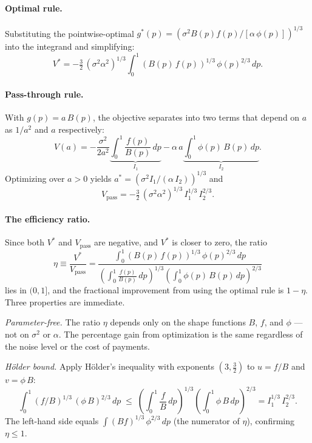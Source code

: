 \documentclass[11pt]{article}
\begin{document}
\paragraph{Optimal rule.} Substituting the pointwise-optimal $g^*(p) = (\sigma^2 B(p) f(p)/[\alpha\,\phi(p)])^{1/3}$ into the integrand and simplifying:
\begin{equation}\label{eq:V-opt}
V^* = -\tfrac{3}{2}\,(\sigma^2 \alpha^2)^{1/3} \int_0^1 (B(p)\,f(p))^{1/3}\,\phi(p)^{2/3}\,dp.
\end{equation}

\paragraph{Pass-through rule.} With $g(p) = a\,B(p)$, the objective separates into two terms that depend on $a$ as $1/a^2$ and $a$ respectively:
\[
V(a) = -\frac{\sigma^2}{2a^2}\underbrace{\int_0^1 \frac{f(p)}{B(p)}\,dp}_{I_1} - \alpha\,a \underbrace{\int_0^1 \phi(p)\,B(p)\,dp}_{I_2}.
\]
Optimizing over $a > 0$ yields $a^* = (\sigma^2 I_1/(\alpha\,I_2))^{1/3}$ and
\begin{equation}\label{eq:V-pass}
V_{\mathrm{pass}} = -\tfrac{3}{2}\,(\sigma^2 \alpha^2)^{1/3}\, I_1^{1/3}\, I_2^{2/3}.
\end{equation}

\paragraph{The efficiency ratio.} Since both $V^*$ and $V_{\mathrm{pass}}$ are negative, and $V^*$ is closer to zero, the ratio
\begin{equation}\label{eq:efficiency}
\eta \equiv \frac{V^*}{V_{\mathrm{pass}}} = \frac{\displaystyle\int_0^1 (B(p)\,f(p))^{1/3}\,\phi(p)^{2/3}\,dp}{\displaystyle\left(\int_0^1 \frac{f(p)}{B(p)}\,dp\right)^{\!1/3}\left(\int_0^1 \phi(p)\,B(p)\,dp\right)^{\!2/3}}
\end{equation}
lies in $(0, 1]$, and the fractional improvement from using the optimal rule is $1 - \eta$. Three properties are immediate.

\emph{Parameter-free.} The ratio $\eta$ depends only on the shape functions $B$, $f$, and $\phi$ --- not on $\sigma^2$ or $\alpha$. The percentage gain from optimization is the same regardless of the noise level or the cost of payments.

\emph{H\"older bound.} Apply H\"older's inequality with exponents $(3, \tfrac{3}{2})$ to $u = f/B$ and $v = \phi\,B$:
\[
\int_0^1 (f/B)^{1/3}\,(\phi\,B)^{2/3}\,dp \;\leq\; \left(\int_0^1 \frac{f}{B}\,dp\right)^{\!1/3}\left(\int_0^1 \phi\,B\,dp\right)^{\!2/3} = I_1^{1/3}\,I_2^{2/3}.
\]
The left-hand side equals $\int (Bf)^{1/3}\,\phi^{2/3}\,dp$ (the numerator of $\eta$), confirming $\eta \leq 1$.
\end{document}
